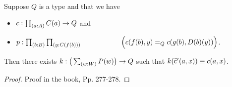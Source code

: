 \documentclass[centering]{report}
\newenvironment{slide}
    {\newpage
    \vspace*{\fill}
    }
    { 
     \vspace*{\fill}
    }
\begin{document}
\begin{slide}
\begin{lem}\label{thm:flattening-rectnd}
  Suppose $Q$ is a type and that we have\\[2mm]
  \begin{itemize}
  \item $c : \prd{a:A} C(a) \to Q$ and
  \item $p : \prd{b:B}{y:C(f(b))}\\
  \hspace*{20mm}\Big(c(f(b),y) =_Q c(g(b),D(b)(y))\Big)$.
  \end{itemize}
  \vspace*{2mm}
  Then there exists $k:\big(\sm{w:W} P(w)\big) \to Q$ such that $k(\widetilde{\mathsf{c}}'(a,x)) \equiv c(a,x)$.
\end{lem}
\begin{proof} Proof in the book, Pp. 277-278.
\end{proof}
\end{slide}
\end{document}
